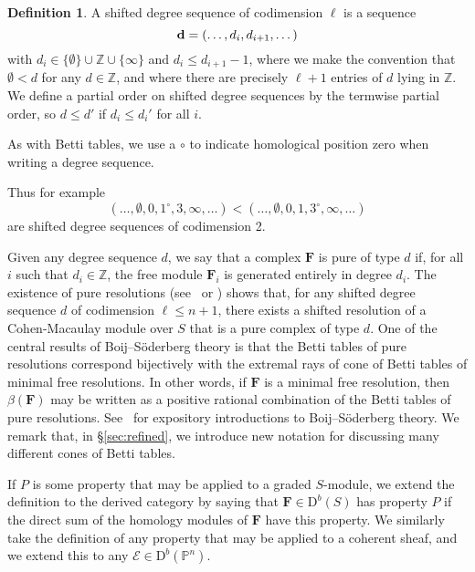 \documentclass[12pt]{amsart}
\theoremstyle{definition}
\newtheorem{defn}[lemma]{Definition}
\theoremstyle{remark}
\newcommand{\PP}{\mathbb{P}}
\newcommand{\ZZ}{\mathbb{Z}}
\newcommand{\cE}{\mathcal{E}}
\newcommand{\FF}{\mathbf{F}}
\newcommand{\defi}[1]{\textsf{#1}} %
\newcommand{\zp}{\circ}
\newcommand{\DD}{\mathrm{D}}
\begin{document}
\begin{defn}
A \defi{shifted degree sequence of codimension $\ell$} is a sequence
\[{\bf d}=(\dots, d_i, d_{i+1}, \dots)
\]
with  $d_{i} \in \{\emptyset\}\cup \ZZ\cup \{\infty\}$ and $d_i \leq d_{i+1}-1$, where we make the convention that $\emptyset<d$ for any $d\in \ZZ$, and 
where there are precisely $\ell+1$ entries of $d$ lying in $\ZZ$. 
We define a partial order on shifted degree sequences by the termwise partial order, so $d\leq d'$ if $d_i\leq d_i'$ for all $i$.

As with Betti tables, we use a $\zp$ to indicate homological position zero when writing a degree sequence. 
\end{defn}



Thus for example
$$
(\dots, \emptyset , 0, 1^{\circ}, 3, \infty, \dots) < (\dots, \emptyset , 0, 1, 3^{\circ}, \infty, \dots) 
$$
are shifted degree sequences of codimension 2.

Given any degree sequence $d$, we say that a complex $\FF$ is \defi{pure of type $d$} if, for all $i$ such that $d_i\in \ZZ$, the free module $\FF_i$ is generated entirely in degree $d_i$.   The existence of pure resolutions (see~\cite{efw} or \cite[\S5]{eis-schrey1}) shows that, for any shifted degree sequence $d$ of codimension $\ell\leq n+1$, there exists a shifted resolution of a Cohen-Macaulay module over $S$ that is a pure complex of type $d$.  One of the central results of Boij--S\"oderberg theory is that the Betti tables of pure resolutions correspond bijectively with the extremal rays of cone of Betti tables of minimal free resolutions.  In other words, if $\FF$ is a minimal free resolution, then $\beta(\FF)$ may be written as a positive rational combination of the Betti tables of pure resolutions.  See~\cite{eis-schrey-icm,floystad-expository} for expository introductions to Boij--S\"oderberg theory.  We remark that, in \S\ref{sec:refined}, we introduce new notation for discussing many different cones of Betti tables.


If $P$ is some property that may be applied to a graded $S$-module, we extend the definition to the derived category by saying that $\FF \in \DD^b(S)$ has property $P$ if the direct sum of the homology modules of $\FF$ have this property. We similarly take the definition of any property that may be applied to a coherent sheaf, and we extend this to any $\cE\in \DD^b(\PP^n)$.  
\end{document}
